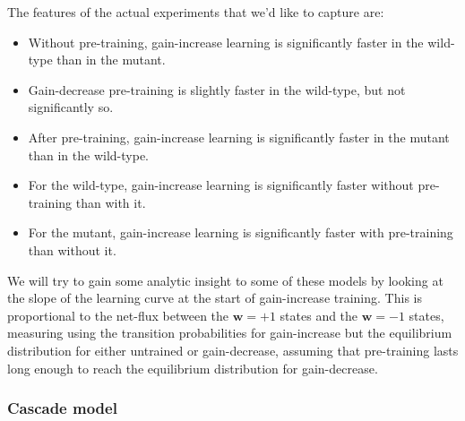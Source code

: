 \documentclass[12pt]{article}
\newcommand{\w}{\mathbf{w}}
\begin{document}
The features of the actual experiments that we'd like to capture are:
\begin{itemize}
  \item Without pre-training, gain-increase learning is significantly faster in the wild-type than in the mutant.
  \item Gain-decrease pre-training is slightly faster in the wild-type, but not significantly so.
  \item After pre-training, gain-increase learning is significantly faster in the mutant than in the wild-type.
  \item For the wild-type, gain-increase learning is significantly faster without pre-training than with it.
  \item For the mutant, gain-increase learning is significantly faster with pre-training than without it.
\end{itemize}

We will try to gain some analytic insight to some of these models by looking at the slope of the learning curve at the start of gain-increase training.
This is proportional to the net-flux between the $\w=+1$ states and the $\w=-1$ states, measuring using the transition probabilities for gain-increase but the equilibrium distribution for either untrained or gain-decrease, assuming that pre-training lasts long enough to reach the equilibrium distribution for gain-decrease.


\subsubsection{Cascade model}\label{sec:cascade}
\end{document}
